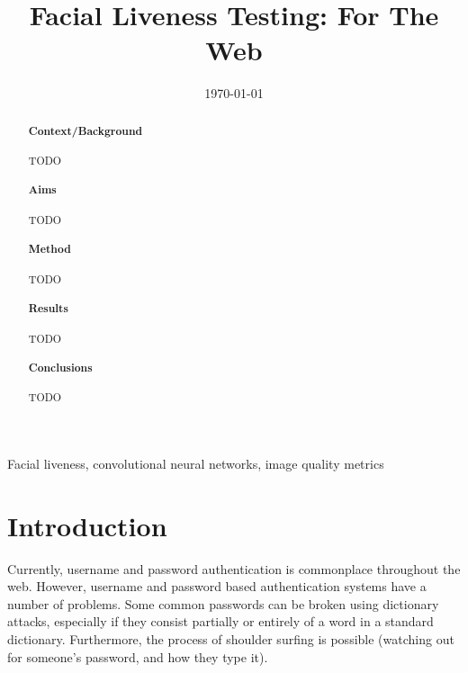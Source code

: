 \documentclass[10pt,a4paper]{article}
\title{Facial Liveness Testing: For The Web}
\author{} %
\date{\today}
\begin{document}
\maketitle

\begin{abstract}

\paragraph{Context/Background}
    TODO

\paragraph{Aims}
    TODO

\paragraph{Method}
    TODO

\paragraph{Results}
    TODO
\paragraph{Conclusions}
    TODO

\end{abstract}

\begin{keywords}
Facial liveness, convolutional neural networks, image quality metrics
\end{keywords}

\section{Introduction}
    Currently, username and password authentication is commonplace throughout the web. However, username and password
    based authentication systems have a number of problems. Some common passwords can be broken using dictionary attacks,
    especially if they consist partially or entirely of a word in a standard dictionary. Furthermore, the process of shoulder surfing is possible (watching out
    for someone's password, and how they type it).
\end{document}

